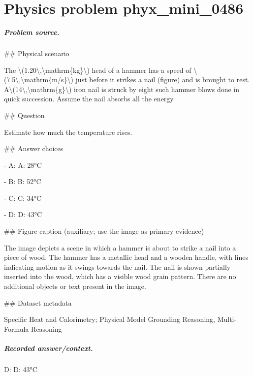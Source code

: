 
\chapter{Physics problem phyx\_mini\_0486}
\label{ch:PhyXMiniProblems_problem_phyx_mini_0486}

\paragraph{Problem source.}
\#\# Physical scenario

The \textbackslash{}(1.20\textbackslash{},\textbackslash{}mathrm\{kg\}\textbackslash{}) head of a hammer has a speed of \textbackslash{}(7.5\textbackslash{},\textbackslash{}mathrm\{m/s\}\textbackslash{}) just before it strikes a nail (figure) and is brought to rest. A\textbackslash{}(14\textbackslash{},\textbackslash{}mathrm\{g\}\textbackslash{}) iron nail is struck by eight such hammer blows done in quick succession. Assume the nail absorbs all the energy.

\#\# Question

Estimate how much the temperature rises.

\#\# Answer choices

- A: A: 28°C

- B: B: 52°C

- C: C: 34°C

- D: D: 43°C

\#\# Figure caption (auxiliary; use the image as primary evidence)

The image depicts a scene in which a hammer is about to strike a nail into a piece of wood. The hammer has a metallic head and a wooden handle, with lines indicating motion as it swings towards the nail. The nail is shown partially inserted into the wood, which has a visible wood grain pattern. There are no additional objects or text present in the image.

\#\# Dataset metadata

Specific Heat and Calorimetry; Physical Model Grounding Reasoning, Multi-Formula Reasoning

\paragraph{Recorded answer/context.}
D: D: 43°C

